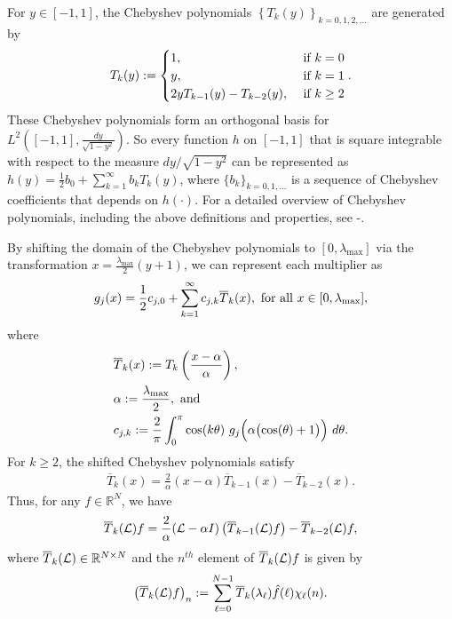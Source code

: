 \documentclass[conference]{IEEEtran}
\renewcommand{\l}{\ell}
\newcommand{\R}{{\mathbb{R}}}
\newcommand{\Rbb}{\mathbb{R}}
\renewcommand{\L}{{\mathcal{L}}}
\def\L{{\cal L}}
\begin{document}
For $y \in [-1,1]$, the Chebyshev polynomials $\left\{T_k(y)\right\}_{k=0,1,2,\ldots}$ are generated by
\begin{eqnarray*}
T_k(y):=\begin{cases}
1,&\hbox{ if }k=0 \\
y,&\hbox{ if }k=1 \\
2yT_{k-1}(y)-T_{k-2}(y),&\hbox{ if }k\geq 2
\end{cases}.
\end{eqnarray*}
These Chebyshev polynomials form an orthogonal basis for \\
$L^2\left([-1,1],\frac{dy}{\sqrt{1-y^2}} \right)$. So every function $h$ on $[-1,1]$ that is square integrable with respect to the measure $dy/\sqrt{1-y^2}$ can be represented as
$h(y)=\frac{1}{2}b_0+\sum_{k=1}^{\infty}b_k T_k(y)$,
where $\{b_k\}_{k=0,1,\ldots}$ is a sequence of Chebyshev coefficients that depends on $h(\cdot)$.
For a detailed overview of Chebyshev polynomials, including the above definitions and properties,
see \cite{handscomb}-\nocite{phillips}\cite{rivlin}.

By shifting the domain of the Chebyshev polynomials to $[0,\lambda_{\max}]$ via the transformation $x=\frac{\lambda_{\max}}{2}(y+1)$, we can represent each multiplier as
\begin{eqnarray} \label{Eq:multiplier_expansion}
g_j(x)=\frac{1}{2}c_{j,0}+\sum_{k=1}^{\infty}c_{j,k}\overline{T}_k(x), \hbox{ for all }x \in [0,\lambda_{\max}],
\end{eqnarray}
where
\begin{align}\label{Eq:cheb_coeffs}
&\overline{T}_k(x):=T_k\left(\frac{x-\alpha}{\alpha}\right),  \nonumber \\
& \alpha:=\frac{\lambda_{\max}}{2}, \hbox{ and } \nonumber \\
& c_{j,k}:= \frac{2}{\pi}\int_{0}^{\pi}\cos(k\theta)~g_j\Bigl(\alpha \bigl(\cos(\theta) +1\bigr)\Bigr)~d\theta.
\end{align}
For $k \geq 2$, the shifted Chebyshev polynomials
satisfy
\begin{eqnarray*}
\overline{T}_k(x) = \frac{2}{\alpha}(x-\alpha)\overline{T}_{k-1}(x)
- \overline{T}_{k-2}(x).
\end{eqnarray*}
Thus, for any $f\in \R^N$, we have
\begin{equation} \label{eq:cheby-f-recurrence}
  \overline{T}_k(\L)f =
  \frac{2}{\alpha}({\L}-{\alpha}I)\left( \overline{T}_{k-1}(\L) f\right)
  - \overline{T}_{k-2}(\L)f,
\end{equation}
where $\overline{T}_k(\L) \in \Rbb^{N \times N}$ and the $n^{th}$ element of $\overline{T}_k(\L)f$ is given by
\begin{eqnarray}\label{Eq:T_bar_def}
\left(\overline{T}_k(\L)f\right)_n:=\sum_{\l=0}^{N-1} \overline{T}_k(\lambda_{\l})\hat{f}(\l)\chi_{\l}(n).
\end{eqnarray}
\end{document}
